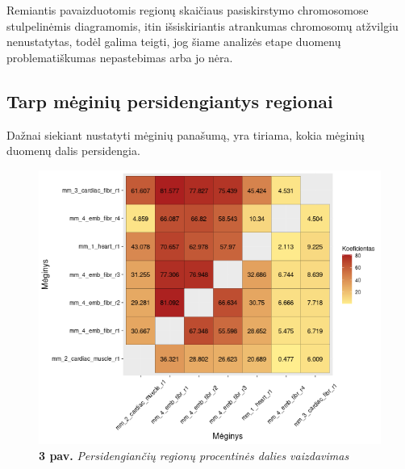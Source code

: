 \documentclass[12pt]{article}
\begin{document}
Remiantis pavaizduotomis regionų skaičiaus pasiskirstymo
chromosomose stulpelinėmis diagramomis, itin išsiskiriantis
atrankumas chromosomų atžvilgiu nenustatytas, todėl galima
teigti, jog šiame analizės etape duomenų problematiškumas
nepastebimas arba jo nėra.

\newpage

\subsection{Tarp mėginių persidengiantys regionai}
Dažnai siekiant nustatyti mėginių panašumą, yra tiriama, kokia
mėginių duomenų dalis persidengia.

\begin{figure}[htb]
    \begin{center}
        \includegraphics[width=0.8\linewidth]{Figures/peak_overlaps_between_samples.png}
        \caption*{\textbf{3 pav.} \emph{Persidengiančių regionų procentinės
                  dalies vaizdavimas}}
    \end{center}
\end{figure}
\end{document}
